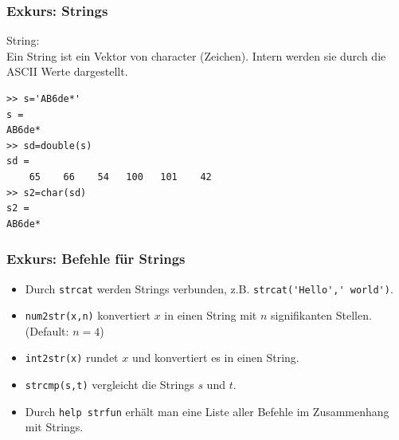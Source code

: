 %
%
\begin{frame}[fragile]\frametitle{Exkurs: Strings}

\alert{String:}\\
 Ein String ist ein Vektor von character (Zeichen). Intern werden sie
 durch die ASCII Werte dargestellt. 
\begin{lstlisting}
>> s='AB6de*'
s =
AB6de*
>> sd=double(s)
sd =
    65    66    54   100   101    42
>> s2=char(sd)
s2 =
AB6de*
\end{lstlisting}  
\end{frame}
%
%
\begin{frame}[fragile]\frametitle{Exkurs: Befehle für Strings}
\begin{itemize}
\item Durch \lstinline!strcat! werden Strings verbunden, z.B. \lstinline!strcat('Hello',' world')!. 
\item \lstinline!num2str(x,n)! konvertiert $x$ in einen String mit $n$
  signifikanten Stellen. (Default: $n=4$)
\item \lstinline!int2str(x)! rundet $x$ und konvertiert es in einen String.
\item \lstinline!strcmp(s,t)! vergleicht die Strings $s$ und $t$. 
\item Durch \lstinline!help strfun! erhält man eine Liste aller Befehle im
  Zusammenhang mit Strings.
\end{itemize}
\end{frame}

